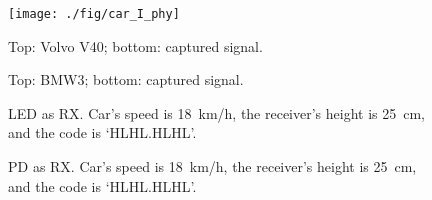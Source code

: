 \documentclass[10pt]{sig-alternate-05-2015}
\begin{document}
\begin{figure}[t!]
	\begin{minipage}[b]{.485\columnwidth}
		\centering
		\subfigure
		{\texttt{[image: ./fig/car\_I\_phy]}}
		\vspace{-3mm}
		\caption{Top: Volvo V40; \newline bottom: captured signal.}
		\vspace{-2mm}
		\label{fig_car_volvo_v40}
	\end{minipage} 
	\hfill
	\begin{minipage}[b]{.485\columnwidth}
		\centering
		\vspace{-3mm}
		\caption{Top: BMW3; \newline bottom: captured signal. }
		\vspace{-2mm}
		\label{fig_car_bmw_3}
	\end{minipage} 
\end{figure}

\begin{figure}[t]
	\hfill
	\vspace{-2mm}
	\caption {LED as RX. Car's speed is 18~km/h, the receiver's height is 25~cm, and the code is `HLHL.HLHL'.}
	\vspace{-2mm}
	\label{fig_d25cmLED}
\end{figure}

\begin{figure}[t!]
	\hfill
	\vspace{-2mm}
	\caption {PD as RX. Car's speed is 18~km/h, the receiver's height is 25~cm, and the code is `HLHL.HLHL'.}
	\vspace{-2mm}
	\label{fig_d25cmPD}
\end{figure}
\end{document}
